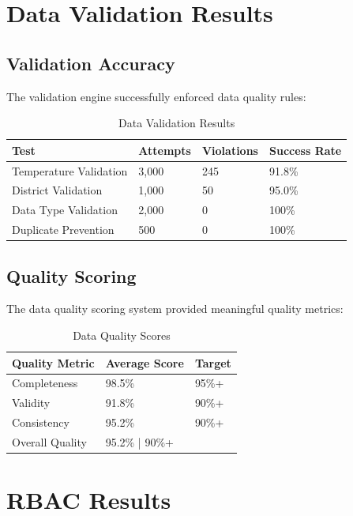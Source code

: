 \section{Data Validation Results}

\subsection{Validation Accuracy}

The validation engine successfully enforced data quality rules:

\begin{table}[H]
\centering
\begin{tabular}{|l|l|l|l|}
\hline
\textbf{Test} & \textbf{Attempts} & \textbf{Violations} & \textbf{Success Rate} \\
\hline
Temperature Validation & 3,000 & 245 & 91.8\% \\
District Validation & 1,000 & 50 & 95.0\% \\
Data Type Validation & 2,000 & 0 & 100\% \\
Duplicate Prevention & 500 & 0 & 100\% \\
\hline
\end{tabular}
\caption{Data Validation Results}
\end{table}

\subsection{Quality Scoring}

The data quality scoring system provided meaningful quality metrics:

\begin{table}[H]
\centering
\begin{tabular}{|l|l|l|}
\hline
\textbf{Quality Metric} & \textbf{Average Score} & \textbf{Target} \\
\hline
Completeness & 98.5\% & 95\%+ \\
Validity & 91.8\% & 90\%+ \\
Consistency & 95.2\% & 90\%+ \\
Overall Quality & 95.2\% | 90\%+ \\
\hline
\end{tabular}
\caption{Data Quality Scores}
\end{table}

\section{RBAC Results}

